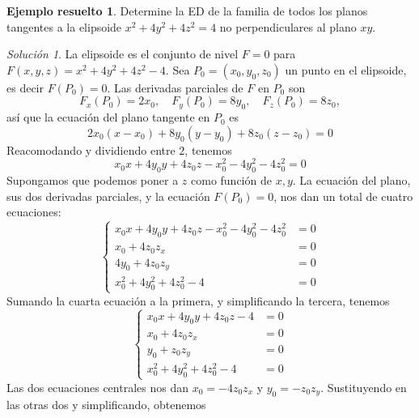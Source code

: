 \documentclass[11pt,letterpaper,draft]{report}
\theoremstyle{plain}
\theoremstyle{definition}
\newtheorem{solved}[theorem]{Ejemplo resuelto}
\theoremstyle{remark}
\newtheorem*{solution}{Solución}
\newcommand\<{\langle}
\renewcommand\>{\rangle}
\begin{document}
\begin{solved}
  Determine la ED de la familia de todos los planos
  tangentes a la elipsoide $x^2 + 4y^2 + 4z^2 = 4$ no
  perpendiculares al plano $xy$.

  \begin{solution}
    La elipsoide es el conjunto de nivel \(F=0\) para
    \(F(x,y,z)=x^{2}+4y^{2}+4z^{2}-4\).
    Sea $P_0=(x_0,y_0,z_0)$ un punto en el elipsoide, es decir 
    \(F(P_0)=0\).
    Las derivadas parciales de \(F\) en \(P_0\) son
    \[
    F_x(P_0) = 2x_0, \quad F_y(P_0) = 8y_0, \quad F_z(P_0) = 8z_0,
    \]
    así que la ecuación del plano tangente en \(P_0\) es
    \begin{equation}
      2x_0(x-x_0) + 8y_0(y-y_0) + 8z_0(z-z_0) = 0
    \end{equation}
    Reacomodando y dividiendo entre \(2\), tenemos
    \begin{equation}
      x_0x+ 4y_0y+ 4z_0z-x_0^{2} -4y_0^{2} -4z_0^{2} = 0
    \end{equation}
    Supongamos que podemos poner a \(z\) como función de \(x,y\).
    La ecuación del plano, sus dos derivadas parciales, y la
    ecuación \(F(P_0)=0\), nos dan un total de cuatro ecuaciones:
    \begin{equation}
      \left\{
        \begin{aligned}
          x_0x+ 4y_0y+ 4z_0z-x_0^{2} -4y_0^{2} -4z_0^{2} &= 0 \\
          x_0 + 4z_0z_x &= 0 \\
          4y_0 + 4z_0z_y &= 0 \\
          x_0^{2}+4y_0^{2}+4z_0^{2}-4 &= 0
        \end{aligned}
      \right.
    \end{equation}
    Sumando la cuarta ecuación a la primera, y simplificando la
    tercera, tenemos
    \begin{equation}
      \left\{
        \begin{aligned}
          x_0x+ 4y_0y+ 4z_0z-4 &= 0 \\
          x_0 + 4z_0z_x &= 0 \\
          y_0 + z_0z_y &= 0 \\
          x_0^{2}+4y_0^{2}+4z_0^{2}-4 &= 0
        \end{aligned}
      \right.
    \end{equation}
    Las dos ecuaciones centrales nos dan \(x_0=-4z_0z_x\) y
    \(y_0=-z_0z_y\). Sustituyendo en las otras dos y simplificando,
    obtenemos
    \begin{equation}

\end{equation}
\end{solution}
\end{solved}
\end{document}
